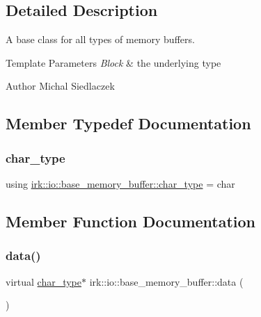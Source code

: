 \subsection{Detailed Description}
A base class for all types of memory buffers. 


\begin{DoxyTemplParams}{Template Parameters}
{\em Block} & the underlying type \\
\hline
\end{DoxyTemplParams}
\begin{DoxyAuthor}{Author}
Michal Siedlaczek 
\end{DoxyAuthor}


\subsection{Member Typedef Documentation}
\mbox{\label{classirk_1_1io_1_1base__memory__buffer_a1b539180df4274dd4ad0402a0ac821ec}} 
\subsubsection{\texorpdfstring{char\+\_\+type}{char\_type}}
{\footnotesize\ttfamily using \mbox{\hyperlink{classirk_1_1io_1_1base__memory__buffer_a1b539180df4274dd4ad0402a0ac821ec}{irk\+::io\+::base\+\_\+memory\+\_\+buffer\+::char\+\_\+type}} =  char}



\subsection{Member Function Documentation}
\mbox{\label{classirk_1_1io_1_1base__memory__buffer_ae8247b83aae579cbc04b5432bd4858cc}} 
\subsubsection{\texorpdfstring{data()}{data()}\hspace{0.1cm}{\footnotesize\ttfamily [1/2]}}
{\footnotesize\ttfamily virtual \mbox{\hyperlink{classirk_1_1io_1_1base__memory__buffer_a1b539180df4274dd4ad0402a0ac821ec}{char\+\_\+type}}$\ast$ irk\+::io\+::base\+\_\+memory\+\_\+buffer\+::data (\begin{DoxyParamCaption}{ }\end{DoxyParamCaption})\hspace{0.3cm}{\ttfamily [pure virtual]}}




